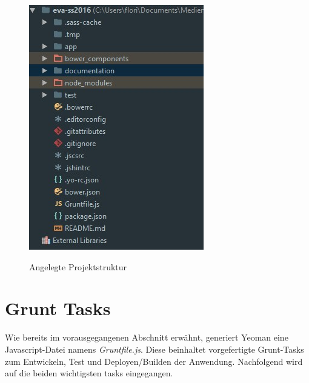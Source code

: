 \begin{figure}[H]
    \centering
    \begin{minipage}[t]{0.49\linewidth}
        \centering
        \includegraphics[width=\linewidth]{images/project_structure.jpg}
        \label{project_structure}
        \caption{Angelegte Projektstruktur}
    \end{minipage}
\end{figure}


\section{Grunt Tasks}
Wie bereits im vorausgegangenen Abschnitt erwähnt, generiert Yeoman eine Javascript-Datei namens \textit{Gruntfile.js}. Diese beinhaltet vorgefertigte Grunt-Tasks zum Entwickeln, Test und
Deployen/Builden der Anwendung. Nachfolgend wird auf die beiden wichtigsten tasks eingegangen.

